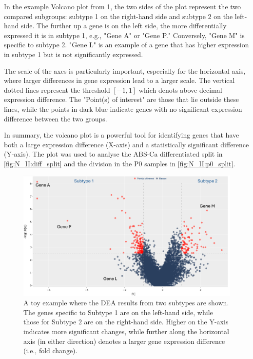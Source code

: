 In the example Volcano plot from \cref{fig:lit:dea_eg}, the two sides of the plot represent the two compared subgroups: subtype 1 on the right-hand side and subtype 2 on the left-hand side. The further up a gene is on the left side, the more differentially expressed it is in subtype 1, e.g., "Gene A" or "Gene P." Conversely, "Gene M" is specific to subtype 2. "Gene L" is an example of a gene that has higher expression in subtype 1 but is not significantly expressed.

The scale of the axes is particularly important, especially for the horizontal axis, where larger differences in gene expression lead to a larger scale. The vertical dotted lines represent the threshold $[-1, 1]$ which denots above decimal expression difference. The "Point(s) of interest" are those that lie outside these lines, while the points in dark blue indicate genes with no significant expression difference between the two groups.

In summary, the volcano plot is a powerful tool for identifying genes that have both a large expression difference (X-axis) and a statistically significant difference (Y-axis). The plot was used to analyse the ABS-Ca differentiated split in \cref{fig:N_II:diff_split} and the division in the P0 samples in \cref{fig:N_II:p0_split}.

\begin{figure}[H] 
    \centering
    \includegraphics[width=1.0\textwidth,height=1.0\textheight,keepaspectratio]{Sections/Lit_review/Resources/volcano_explainer.png}
    \caption[Example - Volcano plot]{A toy example where the DEA results from two subtypes are shown. The genes specific to Subtype 1 are on the left-hand side, while those for Subtype 2 are on the right-hand side. Higher on the Y-axis indicates more significant changes, while further along the horizontal axis (in either direction) denotes a larger gene expression difference (i.e., fold change). }
    \label{fig:lit:dea_eg}
\end{figure}


